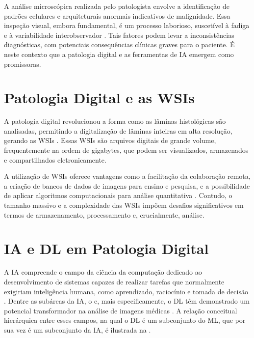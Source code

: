 A análise microscópica realizada pelo patologista envolve a identificação de padrões celulares e arquiteturais anormais indicativos de malignidade. Essa inspeção visual, embora fundamental, é um processo laborioso, suscetível à fadiga e à variabilidade interobservador \cite{CAP2018, SchomigMarkiefka2021}. Tais fatores podem levar a inconsistências diagnósticas, com potenciais consequências clínicas graves para o paciente. É neste contexto que a patologia digital e as ferramentas de IA emergem como promissoras.

\section{Patologia Digital e as WSIs}\label{sec:patologia_digital_wsi}

A patologia digital revolucionou a forma como as lâminas histológicas são analisadas, permitindo a digitalização de lâminas inteiras em alta resolução, gerando as WSIs \cite{Pantanowitz2011}. Essas WSIs são arquivos digitais de grande volume, frequentemente na ordem de gigabytes, que podem ser visualizados, armazenados e compartilhados eletronicamente. %

A utilização de WSIs oferece vantagens como a facilitação da colaboração remota, a criação de bancos de dados de imagens para ensino e pesquisa, e a possibilidade de aplicar algoritmos computacionais para análise quantitativa \cite{Gurcan2009}. Contudo, o tamanho massivo e a complexidade das WSIs impõem desafios significativos em termos de armazenamento, processamento e, crucialmente, análise.

\section{IA e DL em Patologia Digital}\label{sec:ia_dl_patologia}

A IA compreende o campo da ciência da computação dedicado ao desenvolvimento de sistemas capazes de realizar tarefas que normalmente exigiriam inteligência humana, como aprendizado, raciocínio e tomada de decisão \cite{Russell2020}. Dentre as subáreas da IA, o  e, mais especificamente, o DL têm demonstrado um potencial transformador na análise de imagens médicas \cite{Litjens2017}. A relação conceitual hierárquica entre esses campos, na qual o DL é um subconjunto do ML, que por sua vez é um subconjunto da IA, é ilustrada na .

